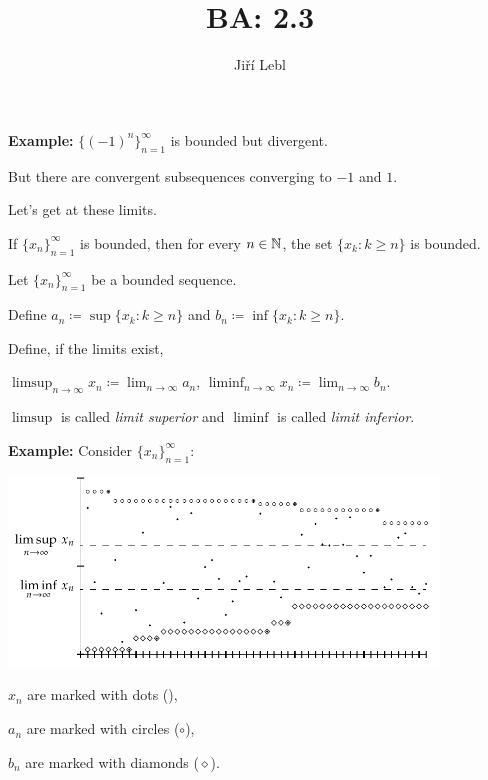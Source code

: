 \documentclass[10pt,aspectratio=149]{beamer}
\author{Ji\v{r}\'i Lebl}
\institute[OSU]{%
Departemento pri Matematiko de Oklahoma {\^S}tata Universitato}
\title{BA: 2.3}
\date{}
\begin{document}
\begin{frame}
\titlepage
\end{frame}

\begin{frame}
\textbf{Example:}
$\bigl\{ {(-1)}^n \bigr\}_{n=1}^\infty$ is bounded but divergent.

\pause
But there are convergent subsequences converging to $-1$ and $1$.

\pause
Let's get at these limits.

\medskip
\pause

If $\{ x_n \}_{n=1}^\infty$ is bounded, then for every $n \in {\mathbb{N}}$, the set $\{ x_k : k \geq n \}$
is bounded.

\pause

\begin{definition}
Let $\{ x_n \}_{n=1}^\infty$ be a bounded sequence.

\medskip
\pause

Define
$a_n \coloneqq \sup \{ x_k : k \geq n \}$ and
$b_n \coloneqq \inf \{ x_k : k \geq n \}$.

\medskip
\pause

Define, if the limits exist,

\medskip

\quad
$\displaystyle
\limsup_{n \to \infty} x_n \coloneqq \lim_{n \to \infty} a_n$,
\qquad
$\displaystyle
\liminf_{n \to \infty} x_n \coloneqq \lim_{n \to \infty} b_n$.
\end{definition}

\pause

$\limsup$ is called \emph{limit superior} and
$\liminf$ is called \emph{limit inferior}.

\end{frame}

\begin{frame}

\textbf{Example:}
Consider $\{x_n\}_{n=1}^\infty$:

\medskip

\includegraphics[width=4.5in]{../figures/sequence-limsupliminf_an_bn}

\medskip

$x_n$ are marked with dots (\raisebox{0.25ex}{\tiny$\bullet$}),

$a_n$ are marked with circles ($\circ$),

$b_n$ are marked with diamonds ($\diamond$).

\end{frame}
\end{document}
